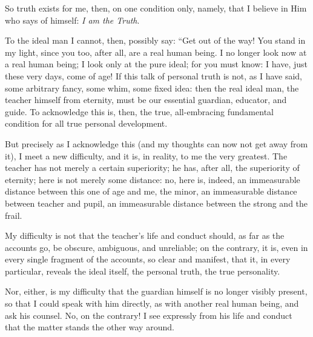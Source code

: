\documentclass[12pt,a4paper]{book}
\begin{document}
So truth exists for me, then, on one condition only, namely, that I believe in Him who says of himself: \emph{I am the Truth}.

To the ideal man I cannot, then, possibly say: ``Get out of the way! You stand in my light, since you too, after all, are a real human being. I no longer look now at a real human being; I look only at the pure ideal; for you must know: I have, just these very days, come of age!
If this talk of personal truth is not, as I have said, some arbitrary fancy, some whim, some fixed idea: then the real ideal man, the teacher himself from eternity, must be our essential guardian, educator, and guide. To acknowledge this is, then, the true, all-embracing fundamental condition for all true personal development.

But precisely as I acknowledge this (and my thoughts can now not get away from it), I meet a new difficulty, and it is, in reality, to me the very greatest. The teacher has not merely a certain superiority; he has, after all, the superiority of eternity; here is not merely some distance: no, here is, indeed, an immeasurable distance between this one of age and me, the minor, an immeasurable distance between teacher and pupil, an immeasurable distance between the strong and the frail.

My difficulty is not that the teacher's life and conduct should, as far as the accounts go, be obscure, ambiguous, and unreliable; on the contrary, it is, even in every single fragment of the accounts, so clear and manifest, that it, in every particular, reveals the ideal itself, the personal truth, the true personality.

Nor, either, is my difficulty that the guardian himself is no longer visibly present, so that I could speak with him directly, as with another real human being, and ask his counsel. No, on the contrary! I see expressly from his life and conduct that the matter stands the other way around.
\end{document}

